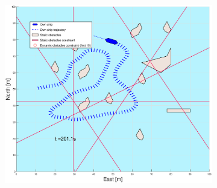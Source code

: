 \begin{figure}[ht]\ContinuedFloat
    \begin{subfigure}[b]{0.49\textwidth}
        \centering
        \includegraphics[width=\textwidth]{Images/Figures/skjergard_u_trafikk/_Simple_1fig1_time=201}
    \end{subfigure}
    \hfill
    \begin{subfigure}[b]{0.499\textwidth}
        \centering

\end{subfigure}
\end{figure}
